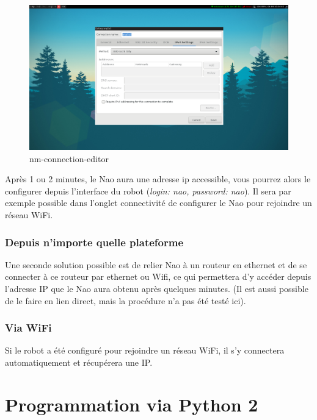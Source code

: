 \documentclass{article}
\begin{document}
\begin{figure}[h]
	\begin{center}
			\includegraphics[scale=0.2]{img/nm-connection-editor}
		\caption{nm-connection-editor}
		\label{fig:nm-connection-editor}
	\end{center}
\end{figure}

Après 1 ou 2 minutes, le Nao aura une adresse ip accessible, vous pourrez alors le configurer depuis l'interface du robot (\emph{login: nao, password: nao}). Il sera par exemple possible dans l'onglet connectivité de configurer le Nao pour rejoindre un réseau WiFi.

\subsubsection{Depuis n'importe quelle plateforme}

Une seconde solution possible est de relier Nao à un routeur en ethernet et de se connecter à ce routeur par ethernet ou Wifi, ce qui permettera d'y accéder depuis l'adresse IP que le Nao aura obtenu après quelques minutes. (Il est aussi possible de le faire en lien direct, mais la procédure n'a pas été testé ici).

\subsubsection{Via WiFi}

Si le robot a été configuré pour rejoindre un réseau WiFi, il s'y connectera automatiquement et récupérera une IP.

\section{Programmation via Python 2}
\end{document}
